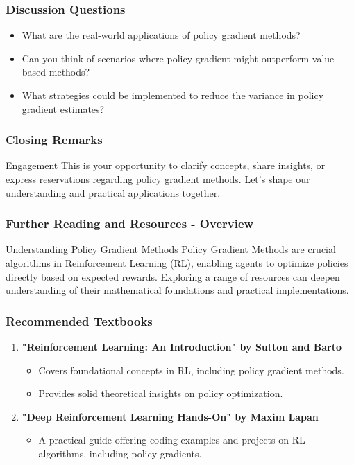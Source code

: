 \documentclass[aspectratio=169]{beamer}
\begin{document}
\begin{frame}
    \frametitle{Discussion Questions}
    \begin{itemize}
        \item What are the real-world applications of policy gradient methods?
        \item Can you think of scenarios where policy gradient might outperform value-based methods?
        \item What strategies could be implemented to reduce the variance in policy gradient estimates?
    \end{itemize}
\end{frame}

\begin{frame}
    \frametitle{Closing Remarks}
    \begin{block}{Engagement}
        This is your opportunity to clarify concepts, share insights, or express reservations regarding policy gradient methods. 
        Let's shape our understanding and practical applications together.
    \end{block}
\end{frame}

\begin{frame}[fragile]
    \frametitle{Further Reading and Resources - Overview}
    \begin{block}{Understanding Policy Gradient Methods}
        Policy Gradient Methods are crucial algorithms in Reinforcement Learning (RL), enabling agents to optimize policies directly based on expected rewards. Exploring a range of resources can deepen understanding of their mathematical foundations and practical implementations.
    \end{block}
\end{frame}

\begin{frame}[fragile]
    \frametitle{Recommended Textbooks}
    \begin{enumerate}
        \item \textbf{"Reinforcement Learning: An Introduction" by Sutton and Barto}
        \begin{itemize}
            \item Covers foundational concepts in RL, including policy gradient methods.
            \item Provides solid theoretical insights on policy optimization.
        \end{itemize}
        
        \item \textbf{"Deep Reinforcement Learning Hands-On" by Maxim Lapan}
        \begin{itemize}
            \item A practical guide offering coding examples and projects on RL algorithms, including policy gradients.
        \end{itemize}
    \end{enumerate}
\end{frame}
\end{document}
